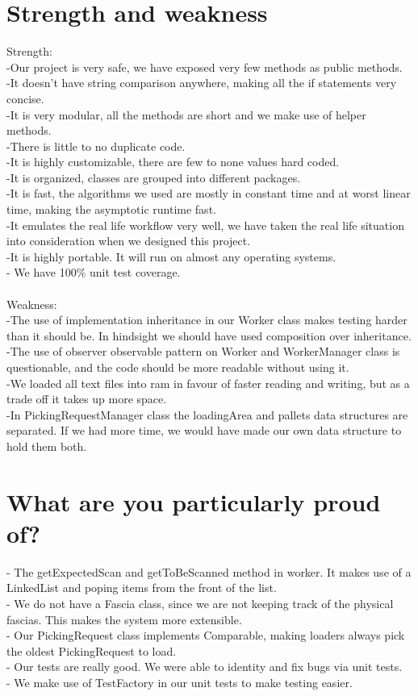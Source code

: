 \documentclass[12pt]{article}
\begin{document}
\section*{Strength and weakness}
Strength:\\
-Our project is very safe, we have exposed very few methods as public methods.\\
-It doesn't have string comparison anywhere, making all the if statements very \\concise.\\
-It is very modular, all the methods are short and we make use of helper methods.\\
-There is little to no duplicate code.\\
-It is highly customizable, there are few to none values hard coded.\\
-It is organized, classes are grouped into different packages.\\
-It is fast, the algorithms we used are mostly in constant time and at worst linear time, making the asymptotic runtime fast.\\ 
-It emulates the real life workflow very well, we have taken the real life situation into consideration when we designed this project.\\
-It is highly portable. It will run on almost any operating systems. \\
- We have 100\% unit test coverage. \\
\hfill\\
Weakness:\\
-The use of implementation inheritance in our Worker class makes testing harder than it should be. In hindsight we should have used composition over inheritance.\\
-The use of observer observable pattern on Worker and WorkerManager class is questionable, and the code should be more readable without using it.\\
-We loaded all text files into ram in favour of faster reading and writing, but as a trade off it takes up more space.\\
-In PickingRequestManager class the loadingArea and pallets data structures are separated. If we had more time, we would have made our own data structure to hold them both.\\
\pagebreak
\section*{What are you particularly proud of?}
- The getExpectedScan and getToBeScanned method in worker. It makes use of a LinkedList and poping items from the front of the list.\\
- We do not have a Fascia class, since we are not keeping track of the physical fascias. This makes the system more extensible.\\
- Our PickingRequest class implements Comparable, making loaders always pick the oldest PickingRequest to load.\\
- Our tests are really good. We were able to identity and fix bugs via unit tests.\\
- We make use of TestFactory in our unit tests to make testing easier.
\pagebreak
\end{document}

